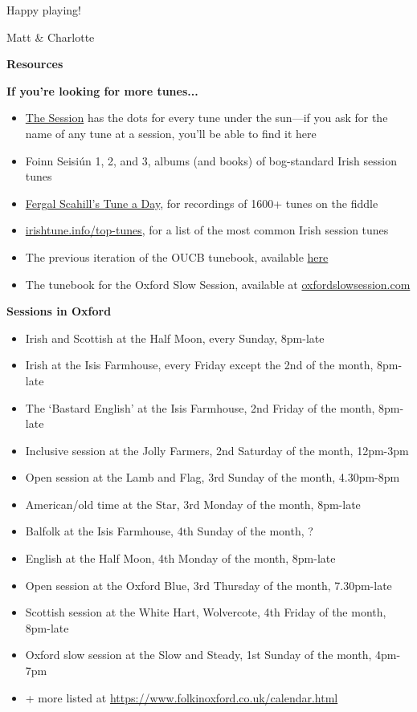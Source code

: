 \documentclass[11pt]{article}
\begin{document}
Happy playing!

Matt \& Charlotte

\vspace{\baselineskip}

\centerline{\Large\textbf{Resources}}
\textbf{If you're looking for more tunes...}
\begin{itemize}
    \item \href{https://thesession.org/}{The Session} has the dots for every tune under the sun---if you ask for the name of any tune at a session, you'll be able to find it here
    \item Foinn Seisi\'un 1, 2, and 3, albums (and books) of bog-standard Irish session tunes
    \item \href{https://youtube.com/playlist?list=PL8B7WrVadMy6TUR_PLEKXhglaretoOnHy&si=mwThMCrgtDoPArmO}{Fergal Scahill's Tune a Day}, for recordings of 1600+ tunes on the fiddle
    \item \href{https://www.irishtune.info/top-tunes/}{irishtune.info/top-tunes}, for a list of the most common Irish session tunes
    \item The previous iteration of the OUCB tunebook, available \href{...}{here}
    \item The tunebook for the Oxford Slow Session, available at \href{https://oxfordslowsession.com/}{oxfordslowsession.com}
\end{itemize}

\textbf{Sessions in Oxford}
\begin{itemize}
    \item Irish and Scottish at the Half Moon, every Sunday, 8pm-late
    \item Irish at the Isis Farmhouse, every Friday except the 2nd of the month, 8pm-late
    \item The `Bastard English' at the Isis Farmhouse, 2nd Friday of the month, 8pm-late
    \item Inclusive session at the Jolly Farmers, 2nd Saturday of the month, 12pm-3pm
    \item Open session at the Lamb and Flag, 3rd Sunday of the month, 4.30pm-8pm
    \item American/old time at the Star, 3rd Monday of the month, 8pm-late
    \item Balfolk at the Isis Farmhouse, 4th Sunday of the month, ?
    \item English at the Half Moon, 4th Monday of the month, 8pm-late
    \item Open session at the Oxford Blue, 3rd Thursday of the month, 7.30pm-late
    \item Scottish session at the White Hart, Wolvercote, 4th Friday of the month, 8pm-late
    \item Oxford slow session at the Slow and Steady, 1st Sunday of the month, 4pm-7pm
    \item + more listed at \url{https://www.folkinoxford.co.uk/calendar.html}
\end{itemize}
\clearpage
\end{document}
